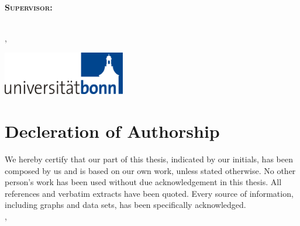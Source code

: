\begin{titlepage}
	\centering
	
	\Large\scshape
	\infoInstitute\\
	\infoDepartment
	\vspace{0.17\textheight}\\
	
	\Huge\normalfont
	\infoTitleHead
	\vspace{0.3\baselineskip}\\
	\huge\bfseries
	\infoTitle
	\vspace{0.12\textheight}\\
	
	\Large
	\infoThesisType\\[0.3\baselineskip]
	\normalfont\large
	Supervisor:	\infoAdvisor
	\vspace{4\baselineskip}\\
	
	\Large
	\infoAuthorP
	
	\infoAuthorI
	\vspace{4\baselineskip}\\
	\infoLocation, \infoDate
	\vfill
	
	\includegraphics[width=0.4\textwidth]{images/uni_bonn_logo}
	
\end{titlepage}
\restoregeometry


\chapter*{Decleration of Authorship}

We hereby certify that our part of this thesis, indicated by our initials, has been composed by us and is based on our own work, unless stated otherwise.
No other person's work has been used without due acknowledgement in this thesis.
All references and verbatim extracts have been quoted.
Every source of information, including graphs and data sets, has been specifically acknowledged.
\vspace{4\baselineskip}\\
\infoLocation, \infoDate \hfill \infoAuthor
\vspace{4\baselineskip}\\

